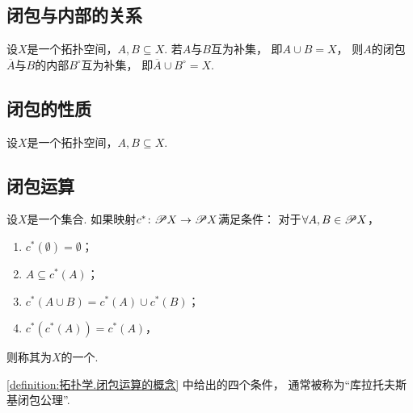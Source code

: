 \subsection{闭包与内部的关系}
\begin{theorem}
设\(X\)是一个拓扑空间，\(A,B \subseteq X\).
若\(A\)与\(B\)互为补集，
即\(A \cup B = X\)，
则\(A\)的闭包\(\overline{A}\)与\(B\)的内部\(B^\circ\)互为补集，
即\(\overline{A} \cup B^\circ = X\).
\end{theorem}

\subsection{闭包的性质}
\begin{property}\label{theorem:拓扑学.闭包的性质}
设\(X\)是一个拓扑空间，\(A,B \subseteq X\).
\end{property}

\subsection{闭包运算}
\begin{definition}\label{definition:拓扑学.闭包运算的概念}
设\(X\)是一个集合.
如果映射\(c^*\colon \mathscr{P} X \to \mathscr{P} X\)满足条件：
对于\(\forall A,B \in \mathscr{P} X\)，\begin{enumerate}
	\item \(c^*(\emptyset) = \emptyset\)；
	\item \(A \subseteq c^*(A)\)；
	\item \(c^*(A \cup B) = c^*(A) \cup c^*(B)\)；
	\item \(c^*(c^*(A)) = c^*(A)\)，
\end{enumerate}
则称其为\(X\)的一个.
\end{definition}
\cref{definition:拓扑学.闭包运算的概念} 中给出的四个条件，
通常被称为“库拉托夫斯基闭包公理”.
